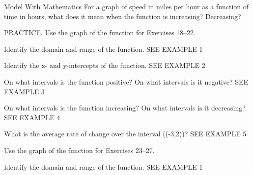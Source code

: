 \documentclass{article}
\newenvironment{practice}[2]{}{}        %
\newcommand{\answer}[1]{}               %
\newcommand{\placeholder}[2]{}          %
\newcommand{\te}[1]{}                   %
\begin{document}
\begin{practice}{17}{3}
Model With Mathematics For a graph of speed in miles per hour as a function of time in hours, what does it mean when the function is increasing? Decreasing?
\answer{When the graph is increasing, the speed is increasing. When the graph is decreasing, the speed is decreasing.}
\end{practice}
\begin{practice}{18}{1}
PRACTICE. Use the graph of the function for Exercises 18--22.
\placeholder{graph}{Shared graph for Exercises 18–22: red upward parabola with vertex (-1,-9), x-intercepts -4 and 2, y-intercept -8. Unit grid, visible window approximately x=-5 to 5 and y=-10 to 2; x-axis labels -3, -1, O, 1, 3; y-axis labels -2, -4, -6, -8. Axes x/y have arrowheads; both upper curve ends have red arrows. No plotted-point circles.}
Identify the domain and range of the function. SEE EXAMPLE 1
\answer{domain: ((-\infty,\infty)); range: ([-9,\infty))}
\end{practice}
\begin{practice}{19}{1}
Identify the x- and y-intercepts of the function. SEE EXAMPLE 2
\te{Use the shared graph printed above Exercise 18.}
\answer{x-intercepts: (-4), 2; y-intercept: (-8)}
\end{practice}
\begin{practice}{20}{1}
On what intervals is the function positive? On what intervals is it negative? SEE EXAMPLE 3
\te{Use the shared graph printed above Exercise 18.}
\answer{negative: ((-4,2)); positive: ((-\infty,-4)) and ((2,\infty))}
\end{practice}
\begin{practice}{21}{1}
On what intervals is the function increasing? On what intervals is it decreasing? SEE EXAMPLE 4
\te{Use the shared graph printed above Exercise 18.}
\answer{decreasing: ((-\infty,-1)); increasing: ((-1,\infty))}
\end{practice}
\begin{practice}{22}{1}
What is the average rate of change over the interval ((-3,2))? SEE EXAMPLE 5
\te{Use the shared graph printed above Exercise 18.}
\answer{1}
\end{practice}
\begin{practice}{23}{1}
Use the graph of the function for Exercises 23--27.
\placeholder{graph}{Shared graph for Exercises 23–27: blue polyline joins filled endpoint (-5,0) to vertex (-1,2) to filled endpoint (5,-1). The descending segment crosses y-axis at 1.5 and x-axis at 3. No line arrows. Unit square grid approximately [-5,5] by [-5,5]; axes x/y arrowed, origin O; x labels -4, -2, 2 and y labels -4, -2, 2, 4.}
Identify the domain and range of the function. SEE EXAMPLE 1
\answer{domain: ([-5,5]); range: ([-1,2])}
\end{practice}
\end{document}
